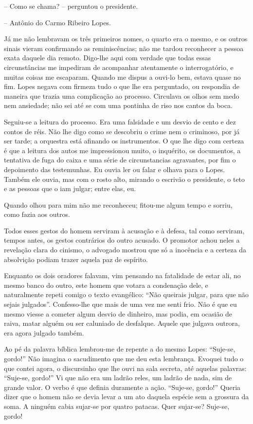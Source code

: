 -- Como se chama? -- perguntou o presidente.

-- Antônio do Carmo Ribeiro Lopes.

Já me não lembravam os três primeiros nomes, o quarto era o mesmo, e os
outros sinais vieram confirmando as reminiscências; não me tardou
reconhecer a pessoa exata daquele dia remoto. Digo-lhe aqui com verdade
que todas essas circunstâncias me impediram de acompanhar atentamente o
interrogatório, e muitas coisas me escaparam. Quando me dispus a ouvi-lo
bem, estava quase no fim. Lopes negava com firmeza tudo o que lhe era
perguntado, ou respondia de maneira que trazia uma complicação ao
processo. Circulava os olhos sem medo nem ansiedade; não sei até se com
uma pontinha de riso nos cantos da boca.

Seguiu-se a leitura do processo. Era uma falsidade e um desvio de cento
e dez contos de réis. Não lhe digo como se descobriu o crime nem o
criminoso, por já ser tarde; a orquestra está afinando os instrumentos.
O que lhe digo com certeza é que a leitura dos autos me impressionou
muito, o inquérito, os documentos, a tentativa de fuga do caixa e uma
série de circunstancias agravantes, por fim o depoimento das
testemunhas. Eu ouvia ler ou falar e olhava para o Lopes. Também ele
ouvia, mas com o rosto alto, mirando o escrivão o presidente, o teto e
as pessoas que o iam julgar; entre elas, eu.

Quando olhou para mim não me reconheceu; fitou-me algum tempo e sorriu,
como fazia aos outros.

Todos esses gestos do homem serviram à acusação e à defesa, tal como
serviram, tempos antes, os gestos contrários do outro acusado. O
promotor achou neles a revelação clara do cinismo, o advogado mostrou
que só a inocência e a certeza da absolvição podiam trazer aquela paz de
espírito.

Enquanto os dois oradores falavam, vim pensando na fatalidade de estar
ali, no mesmo banco do outro, este homem que votara a condenação dele, e
naturalmente repeti comigo o texto evangélico: ``Não queirais julgar,
para que não sejais julgados''. Confesso-lhe que mais de uma vez me
senti frio. Não é que eu mesmo viesse a cometer algum desvio de
dinheiro, mas podia, em ocasião de raiva, matar alguém ou ser caluniado
de desfalque. Aquele que julgava outrora, era agora julgado também.

Ao pé da palavra bíblica lembrou-me de repente a do mesmo Lopes:
``Suje-se, gordo!'' Não imagina o sacudimento que me deu esta lembrança.
Evoquei tudo o que contei agora, o discursinho que lhe ouvi na sala
secreta, até aquelas palavras: ``Suje-se, gordo!'' Vi que não era um
ladrão reles, um ladrão de nada, sim de grande valor. O verbo é que
definia duramente a ação. ``Suje-se, gordo!'' Queria dizer que o homem
não se devia levar a um ato daquela espécie sem a grossura da soma. A
ninguém cabia sujar-se por quatro patacas. Quer sujar-se? Suje-se,
gordo!

